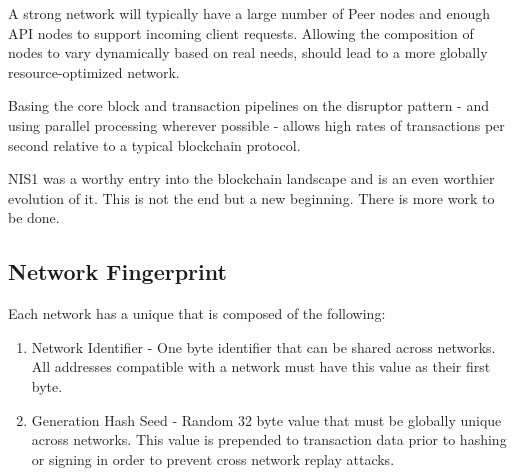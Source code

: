A strong network will typically have a large number of Peer nodes and enough API nodes to support incoming client requests.
Allowing the composition of nodes to vary dynamically based on real needs, should lead to a more globally resource-optimized network.

Basing the core block and transaction pipelines on the disruptor pattern - and using parallel processing wherever possible - allows high rates of transactions per second relative to a typical blockchain protocol.

NIS1 was a worthy entry into the blockchain landscape and \codenamespace is an even worthier evolution of it.
This is not the end but a new beginning.
There is more work to be done.

\subsection{Network Fingerprint}

Each network has a unique  that is composed of the following:
\begin{enumerate}
	\item{Network Identifier -
		One byte identifier that can be shared across networks.
		All addresses compatible with a network must have this value as their first byte.
	}
	\item{Generation Hash Seed -
		Random 32 byte value that must be globally unique across networks.
		This value is prepended to transaction data prior to hashing or signing in order to prevent cross network replay attacks.
	}
\end{enumerate}
